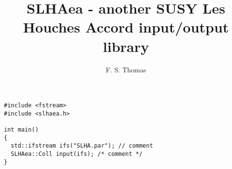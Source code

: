 \documentclass[
  11pt,
  ]{revtex4-1}
\begin{document}
\title{SLHAea - another SUSY Les Houches Accord input/output library}

\author{F. S. Thomas}

\begin{abstract}
\end{abstract}

\maketitle
\tableofcontents


\begin{lstlisting}
#include <fstream>
#include <slhaea.h>

int main()
{
  std::ifstream ifs("SLHA.par"); // comment
  SLHAea::Coll input(ifs); /* comment */
}
\end{lstlisting}




\nocite{*}
\end{document}
